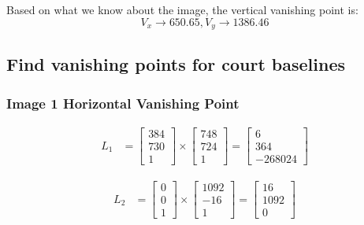 \documentclass[12pt, oneside]{article}
\begin{document}
Based on what we know about the image, the vertical vanishing point is:
$$    {V_x\to 650.65,V_y\to 1386.46}   $$


\subsection{Find vanishing points for court baselines}

\subsubsection*{Image 1 Horizontal Vanishing Point}

\begin{align*}
L_1 &=    \begin{bmatrix}
            384 \\
            730 \\
            1
        \end{bmatrix} \times 
        \begin{bmatrix}
            748 \\
            724 \\
            1
        \end{bmatrix}  = 
        \begin{bmatrix}
            6  \\
            364 \\
            -268024 
        \end{bmatrix}                                                   
\end{align*}

\begin{align*}
L_2 &=    \begin{bmatrix}
            0 \\
            0 \\
            1
        \end{bmatrix} \times 
        \begin{bmatrix}
            1092 \\
            -16 \\
            1
        \end{bmatrix}  = 
        \begin{bmatrix}
            16  \\
            1092 \\
            0 
        \end{bmatrix}                                                   
\end{align*}
\end{document}
